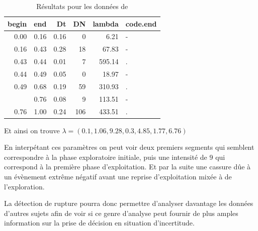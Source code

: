 \documentclass[a4paper,10pt]{article}\usepackage[]{graphicx}\usepackage[]{xcolor}
\newenvironment{knitrout}{}{} %
\begin{document}
\begin{table}[!h]
    \centering
\begin{knitrout}
\color{fgcolor}
\begin{tabular}{rrrrrl}
\toprule
begin & end & Dt & DN & lambda & code.end\\
\midrule
0.00 & 0.16 & 0.16 & 0 & 6.21 & -\\
0.16 & 0.43 & 0.28 & 18 & 67.83 & -\\
0.43 & 0.44 & 0.01 & 7 & 595.14 & .\\
0.44 & 0.49 & 0.05 & 0 & 18.97 & -\\
0.49 & 0.68 & 0.19 & 59 & 310.93 & .\\
\addlinespace
0.68 & 0.76 & 0.08 & 9 & 113.51 & -\\
0.76 & 1.00 & 0.24 & 106 & 433.51 & .\\
\bottomrule
\end{tabular}

\end{knitrout}
    \caption{Résultats pour les données de \cite{soubeyrandDonneesTheseExperience2024}}
    \label{tab:resultat-soub-cv}
\end{table}

Et ainsi on trouve $\lambda = (0.1, 1.06, 9.28, 0.3, 4.85, 1.77, 6.76)$

En interpétant ces paramètres on peut voir deux premiers segments qui semblent
correspondre à la phase exploratoire initiale, puis une intensité de $9$ qui 
correspond à la première phase d'exploitation. Et par la suite une cassure dûe
à un évènement extrême négatif avant une reprise d'exploitation mixée à de 
l'exploration.

La détection de rupture pourra donc permettre d'analyser davantage les données 
d'autres sujets afin de voir si ce genre d'analyse peut fournir de plus amples
information sur la prise de décision en situation d'incertitude.

\newpage

\printbibliography
\nocite{*}
\end{document}
